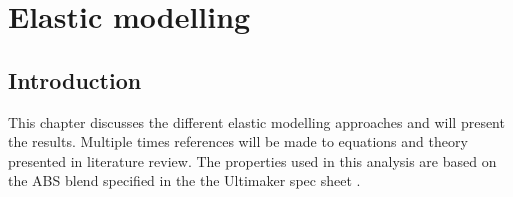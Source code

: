 \chapter{Elastic modelling}
\label{chp:Elasticmodelling}
\graphicspath{{chapter_6_Elasticmodelling/figures/chapter_6.tex}}%

\section{Introduction}
This chapter discusses the different elastic modelling approaches and will present the results. Multiple times references will be made to equations and theory presented in literature review. The properties used in this analysis are based on the ABS blend specified in the the Ultimaker spec sheet \cite{Ultimaker2018TechnicalABS}.







